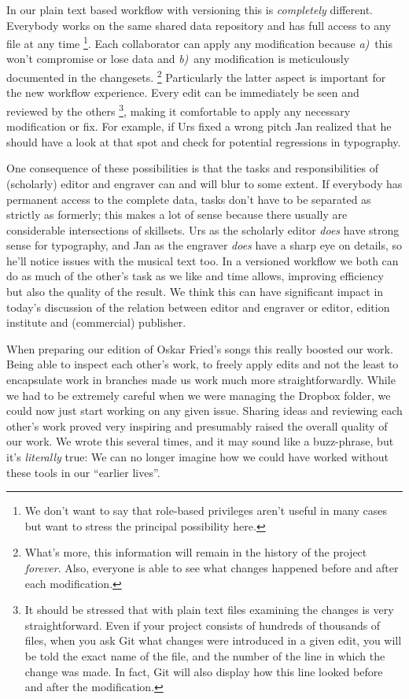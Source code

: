\documentclass[11pt,a4paper]{article}
\begin{document}
In our plain text based workflow with versioning this is \emph{completely} different.
Everybody works on the same shared data repository and has full access to any file at any
time%
\footnote{We don't want to say that role-based privileges aren't useful in many cases
but want to stress the principal possibility here.}.
Each collaborator can apply any modification because 
\mbox{\emph{a)} this} won't compromise or lose data and
\mbox{\emph{b)} any} modification is meticulously documented in the changesets.%
\footnote{What's more, this information will remain in the history
of the project \emph{forever}. Also, everyone is able to see what changes
happened before and after each modification.}
Particularly the latter aspect is important for the new workflow experience. 
Every edit can be immediately be seen and reviewed by the others%
\footnote{It should be stressed that with plain text files examining the changes
is very straightforward. Even if your project consists of hundreds of thousands of files,
when you ask Git what changes were introduced in a given edit, you will be told the
exact name of the file, and the number of the line in which the change was made.
In fact, Git will also display how this line looked before and after the modification.},
making it comfortable
to apply any necessary modification or fix. For example, if Urs fixed a wrong pitch Jan
realized that he should have a look at that spot and check for potential regressions
in typography.

One consequence of these possibilities is that the tasks and responsibilities of
(scholarly) editor and engraver can and will blur to some extent. If everybody has
permanent access to the complete data, tasks don't have to be separated as
strictly as formerly; this makes a lot of sense because there usually are considerable
intersections of skillsets. Urs as the scholarly editor \emph{does} have strong sense
for typography, and Jan as the engraver \emph{does} have a sharp eye on details, so
he'll notice issues with the musical text too. In a versioned workflow we both can do
as much of the other's task as we like and time allows, improving efficiency but also
the quality of the result. We think this can have significant impact in today's
discussion of the relation between editor and engraver or editor, edition institute and
(commercial) publisher.

When preparing our edition of Oskar Fried's songs this really boosted our work. Being
able to inspect each other's work, to freely apply edits and not the least to encapsulate
work in branches made us work much more straightforwardly. While we had to be
extremely careful when we were managing the Dropbox folder, we could now just start working
on any given issue. Sharing ideas and reviewing each other's work proved very inspiring
and presumably raised the overall quality of our work. We wrote this several times, and
it may sound like a buzz-phrase, but it's \emph{literally} true: We can no longer imagine
how we could have worked without these tools in our “earlier lives”.
\end{document}

